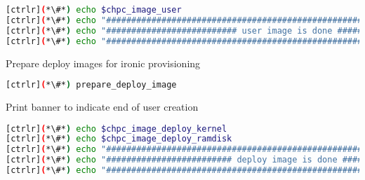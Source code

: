 \begin{lstlisting}[language=bash,keywords={},upquote=true]
[ctrlr](*\#*) echo $chpc_image_user
[ctrlr](*\#*) echo "########################################################################"
[ctrlr](*\#*) echo "########################## user image is done ##########################"
[ctrlr](*\#*) echo "########################################################################"
\end{lstlisting}

	
	Prepare deploy images for ironic provisioning 

\begin{lstlisting}[language=bash,keywords={},upquote=true]
[ctrlr](*\#*) prepare_deploy_image
\end{lstlisting}

	
	Print banner to indicate end of user creation

\begin{lstlisting}[language=bash,keywords={},upquote=true]
[ctrlr](*\#*) echo $chpc_image_deploy_kernel
[ctrlr](*\#*) echo $chpc_image_deploy_ramdisk
[ctrlr](*\#*) echo "########################################################################"
[ctrlr](*\#*) echo "######################### deploy image is done #########################"
[ctrlr](*\#*) echo "########################################################################"
\end{lstlisting}


